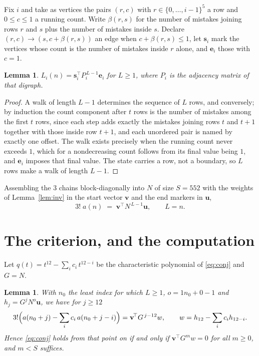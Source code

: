 \documentclass[11pt,a4paper]{article}
\theoremstyle{plain}
\newtheorem{lemma}[theorem]{Lemma}
\theoremstyle{definition}
\begin{document}
Fix $i$ and take as vertices the pairs $(r,c)$ with $r\in\{0,\dots,i-1\}^{5}$ a row
and $0\le c\le1$ a running count. Write $\beta(r,s)$ for the number of mistakes joining
rows $r$ and $s$ plus the number of mistakes inside $s$. Declare $(r,c)\to(s,c+\beta(r,s))$
an edge when $c+\beta(r,s)\le1$, let $\mathbf{s}_i$ mark the vertices whose count is the
number of mistakes inside $r$ alone, and $\mathbf{e}_i$ those with $c=1$.

\begin{lemma}\label{lem:walk}
$L_i(n)=\mathbf{s}_i^{\!\top}P_i^{\,L-1}\mathbf{e}_i$ for $L\ge1$, where $P_i$ is the
adjacency matrix of that digraph.
\end{lemma}

\begin{proof}
A walk of length $L-1$ determines the sequence of $L$ rows, and conversely; by induction
the count component after $t$ rows is the number of mistakes among the first $t$ rows,
since each step adds exactly the mistakes joining rows $t$ and $t+1$ together with those
inside row $t+1$, and each unordered pair is named by exactly one offset. The walk exists
precisely when the running count never exceeds $1$, which for a nondecreasing count follows
from its final value being $1$, and $\mathbf{e}_i$ imposes that final value. The state
carries a row, not a boundary, so $L$ rows make a walk of length $L-1$.
\end{proof}

Assembling the $3$ chains block-diagonally into $N$ of size $S=552$ with the weights of
Lemma~\ref{lem:inv} in the start vector $\mathbf{v}$ and the end markers in
$\mathbf{u}$,
\begin{equation}\label{eq:walk2}
3!\;a(n)\;=\;\mathbf{v}^{\!\top}N^{\,L-1}\mathbf{u},\qquad L=n .
\end{equation}

\section{The criterion, and the computation}

Let $q(t)=t^{12}-\sum_i c_i\,t^{12-i}$ be the characteristic polynomial of
\eqref{eq:conj} and $G=N$.

\begin{lemma}\label{lem:crit}
With $n_0$ the least index for which $L\ge1$, $o=1n_0+0-1$ and
$h_j=G^{j}N^{o}\mathbf{u}$, we have for $j\ge12$
\[
3!\Bigl(a(n_0+j)-\sum_i c_i\,a(n_0+j-i)\Bigr)=\mathbf{v}^{\!\top}G^{\,j-12}w,
\qquad w=h_{12}-\sum_i c_ih_{12-i} .
\]
Hence \eqref{eq:conj} holds from that point on if and only if
$\mathbf{v}^{\!\top}G^{m}w=0$ for all $m\ge0$, and $m<S$ suffices.
\end{lemma}
\end{document}
